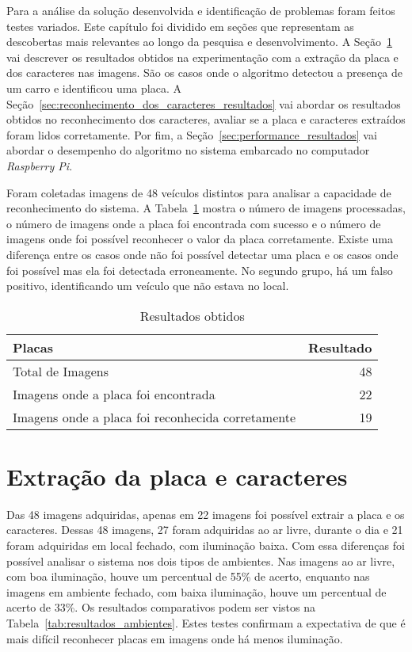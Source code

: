 Para a análise da solução desenvolvida e identificação de problemas foram feitos
testes variados. Este capítulo foi dividido em seções que representam as
descobertas mais relevantes ao longo da pesquisa e desenvolvimento. A
Seção~\ref{sec:extracao_da_placa_resultados} vai descrever os resultados obtidos
na experimentação com a extração da placa e dos caracteres nas imagens. São os casos
onde o algoritmo detectou a presença de um carro e identificou uma placa. A
Seção~\ref{sec:reconhecimento_dos_caracteres_resultados} vai abordar os
resultados obtidos no reconhecimento dos caracteres, avaliar se a placa e caracteres
extraídos foram lidos corretamente. Por fim, a
Seção~\ref{sec:performance_resultados} vai abordar o desempenho do algoritmo no
sistema embarcado no computador \emph{Raspberry Pi}.

Foram coletadas imagens de 48 veículos distintos para analisar a capacidade de
reconhecimento do sistema. A Tabela~\ref{tab:resultados} mostra o número de
imagens processadas, o número de imagens onde a placa foi encontrada com sucesso
e o número de imagens onde foi possível reconhecer o valor da placa corretamente.
Existe uma diferença entre os casos onde não foi possível detectar uma placa e os
casos onde foi possível mas ela foi detectada erroneamente. No segundo grupo, há um falso
positivo, identificando um veículo que não estava no local.

\begin{table}[]
\centering
\caption{Resultados obtidos}
\label{tab:resultados}
\begin{tabular}{@{}lr@{}}
\toprule
Placas                               & \multicolumn{1}{l}{Resultado} \\ \midrule
Total de Imagens                     & 48                           \\
Imagens onde a placa foi encontrada  & 22                            \\
Imagens onde a placa foi reconhecida corretamente & 19 \\ \bottomrule
\end{tabular}
\end{table}

\section{Extração da placa e caracteres}
\label{sec:extracao_da_placa_resultados}

Das 48 imagens adquiridas, apenas em 22 imagens foi possível extrair a placa e
os caracteres. Dessas 48 imagens, 27 foram adquiridas ao ar livre, durante o dia
e 21 foram adquiridas em local fechado, com iluminação baixa. Com essa
diferenças foi possível analisar o sistema nos dois tipos de ambientes. Nas
imagens ao ar livre, com boa iluminação, houve um percentual de 55\% de acerto,
enquanto nas imagens em ambiente fechado, com baixa iluminação, houve um
percentual de acerto de 33\%. Os resultados comparativos podem ser vistos na
Tabela~\ref{tab:resultados_ambientes}. Estes testes confirmam a expectativa de que é mais
difícil reconhecer placas em imagens onde há menos iluminação.


